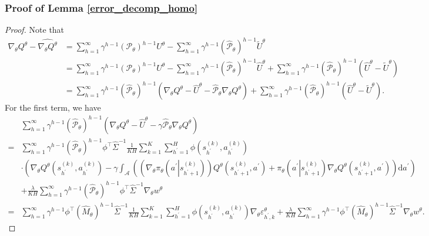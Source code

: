 \documentclass{article}
\numberwithin{equation}{section}
\begin{document}
\subsubsection{Proof of Lemma \ref{error_decomp_homo}}
\begin{proof}
Note that
\begin{align*}
    \nabla_\theta Q^\theta-\widehat{\nabla_\theta Q^\theta}&=\sum_{h=1}^\infty\gamma^{h-1}\left(\mathcal{P}_\theta\right)^{h-1}U^\theta-\sum_{h=1}^\infty\gamma^{h-1}\left(\widehat{\mathcal{P}}_\theta\right)^{h-1}\tilde{U}^\theta\\
    &=\sum_{h=1}^\infty\gamma^{h-1}\left(\mathcal{P}_\theta\right)^{h-1}U^\theta-\sum_{h=1}^\infty\gamma^{h-1}\left(\widehat{\mathcal{P}}_\theta\right)^{h-1}\widehat{U}^\theta+\sum_{h=1}^\infty\gamma^{h-1}\left(\widehat{\mathcal{P}}_\theta\right)^{h-1}\left(\widehat{U}^\theta-\tilde{U}^\theta\right)\\
    &=\sum_{h=1}^\infty\gamma^{h-1}\left(\widehat{\mathcal{P}}_\theta\right)^{h-1}\left(\nabla_\theta Q^\theta-\widehat{U}^\theta-\widehat{\mathcal{P}}_\theta\nabla_\theta Q^\theta\right)+\sum_{h=1}^\infty\gamma^{h-1}\left(\widehat{\mathcal{P}}_\theta\right)^{h-1}\left(\widehat{U}^\theta-\tilde{U}^\theta\right).
\end{align*}
For the first term, we have
\begin{align*}
    &\sum_{h=1}^\infty\gamma^{h-1}\left(\widehat{\mathcal{P}}_\theta\right)^{h-1}\left(\nabla_\theta Q^\theta-\widehat{U}^\theta-\gamma\widehat{\mathcal{P}}_\theta\nabla_\theta Q^\theta\right)\\
    =&\sum_{h=1}^\infty\gamma^{h-1}\left(\widehat{\mathcal{P}}_\theta\right)^{h-1}\phi^\top\widehat{\Sigma}^{-1}\frac{1}{KH}\sum_{k=1}^K\sum_{h^\prime=1}^H\phi\left(s_{h^\prime}^{(k)},a_{h^\prime}^{(k)}\right)\\
    &\cdot\left(\nabla_\theta Q^\theta\left(s_{h^\prime}^{(k)},a_{h^\prime}^{(k)}\right)-\gamma\int_{\mathcal{A}}\left(\left(\nabla_\theta\pi_\theta\left(a^\prime\left\vert s_{h^\prime+1}^{(k)}\right.\right)\right)Q^{\theta}\left(s_{h^\prime+1}^{(k)},a^\prime\right)+\pi_\theta\left(a^\prime\left\vert s_{h^\prime+1}^{(k)}\right.\right)\nabla_\theta Q^\theta\left(s_{h^\prime+1}^{(k)},a^\prime\right)\right)\mathrm{d}a^\prime\right)\\
    &+\frac{\lambda}{KH}\sum_{h=1}^\infty\gamma^{h-1}\left(\widehat{\mathcal{P}}_\theta\right)^{h-1}\phi^\top\widehat{\Sigma}^{-1}\nabla_\theta w^\theta\\
    =&\sum_{h=1}^\infty\gamma^{h-1}\phi^\top\left(\widehat{M}_\theta\right)^{h-1}\widehat{\Sigma}^{-1}\frac{1}{KH}\sum_{k=1}^K\sum_{h^\prime=1}^H\phi\left(s_{h^\prime}^{(k)},a_{h^\prime}^{(k)}\right)\nabla_\theta\varepsilon_{h^\prime,k}^\theta+\frac{\lambda}{KH}\sum_{h=1}^\infty\gamma^{h-1}\phi^\top\left(\widehat{M}_\theta\right)^{h-1}\widehat{\Sigma}^{-1}\nabla_\theta w^\theta.

\end{align*}
\end{proof}
\end{document}
